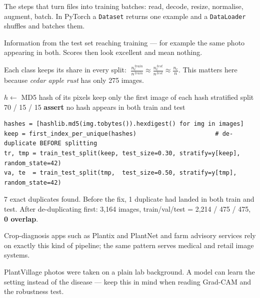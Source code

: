 \documentclass[11pt,a4paper]{article}
\begin{document}

\begin{bdef}
The steps that turn files into training batches: read, decode, resize, normalise, augment, batch. In PyTorch a \texttt{Dataset} returns one example and a \texttt{DataLoader} shuffles and batches them.
\end{bdef}
\begin{bdef}
Information from the test set reaching training --- for example the same photo appearing in both. Scores then look excellent and mean nothing.
\end{bdef}
\begin{bmath}
Each class keeps its share in every split: $\;\frac{n_c^{\,train}}{n^{\,train}}\approx\frac{n_c^{\,test}}{n^{\,test}}\approx\frac{n_c}{n}$. This matters here because \emph{cedar apple rust} has only 275 images.
\end{bmath}
\begin{balgo}
\begin{algorithmic}[1]
  \State $h\gets$ MD5 hash of its pixels
\EndFor
\State keep only the first image of each hash
\State stratified split 70 / 15 / 15
\State \textbf{assert} no hash appears in both train and test
\end{algorithmic}
\end{balgo}
\begin{bcode}
\begin{lstlisting}
hashes = [hashlib.md5(img.tobytes()).hexdigest() for img in images]
keep = first_index_per_unique(hashes)                      # de-duplicate BEFORE splitting
tr, tmp = train_test_split(keep, test_size=0.30, stratify=y[keep], random_state=42)
va, te  = train_test_split(tmp,  test_size=0.50, stratify=y[tmp],  random_state=42)
\end{lstlisting}
\end{bcode}
\begin{bres}
7 exact duplicates found. Before the fix, 1 duplicate had landed in both train and test. After de-duplicating first: 3,164 images, train/val/test = 2,214 / 475 / 475, \textbf{0 overlap}.
\end{bres}
\begin{bapp}
Crop-diagnosis apps such as Plantix and PlantNet and farm advisory services rely on exactly this kind of pipeline; the same pattern serves medical and retail image systems.
\end{bapp}
\begin{bwarn}
PlantVillage photos were taken on a plain lab background. A model can learn the setting instead of the disease --- keep this in mind when reading Grad-CAM and the robustness test.
\end{bwarn}
\end{document}

